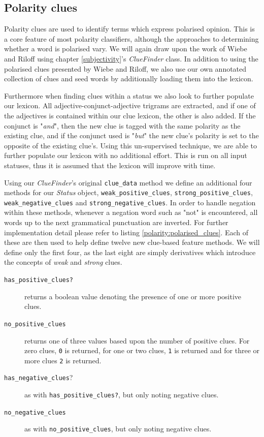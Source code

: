 \subsection{Polarity clues}
\label{polarity:clues}

Polarity clues are used to identify terms which express polarised opinion. This is a core feature of most polarity classifiers, although the approaches to determining whether a word is polarised vary. We will again draw upon the work of Wiebe and Riloff \cite{Wiebe:2003wa} using chapter \ref{subjectivity}'s \emph{ClueFinder} class. In addition to using the polarised clues presented by Wiebe and Riloff, we also use our own annotated collection of clues and seed words by additionally loading them into the lexicon.

Furthermore when finding clues within a status we also look to further populate our lexicon. All adjective-conjunct-adjective trigrams are extracted, and if one of the adjectives is contained within our clue lexicon, the other is also added. If the conjunct is "\emph{and}", then the new clue is tagged with the same polarity as the existing clue, and if the conjunct used is "\emph{but}" the new clue's polarity is set to the opposite of the existing clue's. Using this un-supervised technique, we are able to further populate our lexicon with no additional effort. This is run on all input statuses, thus it is assumed that the lexicon will improve with time. 

Using our \emph{ClueFinder}'s original \texttt{clue\_data} method we define an additional four methods for our \emph{Status} object, \texttt{weak\-\_positive\-\_clues}, \texttt{strong\-\_positive\-\_clues}, \texttt{weak\-\_negative\-\_clues} and \texttt{strong\-\_negative\-\_clues}. In order to handle negation within these methods, whenever a negation word such as "not" is encountered, all words up to the next grammatical punctuation are inverted. For further implementation detail please refer to listing \ref{polarity:polarised_clues}. Each of these are then used to help define twelve new clue-based feature methods. We will define only the first four, as the last eight are simply derivatives which introduce the concepts of \emph{weak} and \emph{strong} clues.

\begin{description}
	\item [\texttt{has\_positive\_clues?}] returns a boolean value denoting the presence of one or more positive clues.
	\item [\texttt{no\_positive\_clues}] returns one of three values based upon the number of positive clues. For zero clues, \texttt{0} is returned, for one or two clues, \texttt{1} is returned and for three or more clues \texttt{2} is returned.
	\item [\texttt{has\_negative\_clues}?] as with \texttt{has\-\_positive\-\_clues?}, but only noting negative clues.
	\item [\texttt{no\_negative\_clues}] as with \texttt{no\-\_positive\-\_clues}, but only noting negative clues.
\end{description}


